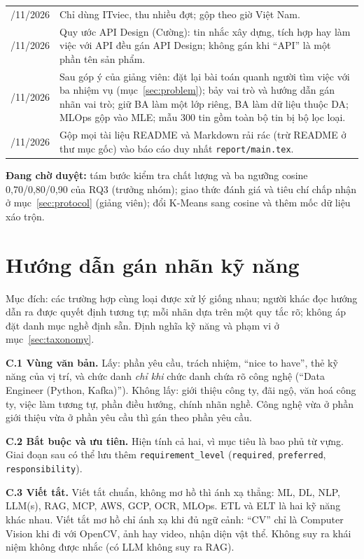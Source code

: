\documentclass[12pt]{article}
\newcommand{\code}[1]{\texttt{#1}}
\begin{document}
\begin{longtable}{>{\raggedright\arraybackslash}p{2.2cm} >{\raggedright\arraybackslash}p{12.4cm}}
03/11/2026 & Chỉ dùng ITviec, thu nhiều đợt; gộp theo giờ Việt Nam. \\
05/11/2026 & Quy ước API Design (Cường): tin nhắc xây dựng, tích hợp hay làm việc với API đều gán API Design; không gán khi ``API'' là một phần tên sản phẩm. \\
07/11/2026 & Sau góp ý của giảng viên: đặt lại bài toán quanh người tìm việc với ba nhiệm vụ (mục~\ref{sec:problem}); bảy vai trò và hướng dẫn gán nhãn vai trò; giữ BA làm một lớp riêng, BA làm dữ liệu thuộc DA; MLOps gộp vào MLE; mẫu 300 tin gồm toàn bộ tin bị bộ lọc loại. \\
08/11/2026 & Gộp mọi tài liệu README và Markdown rải rác (trừ README ở thư mục gốc) vào báo cáo duy nhất \code{report/main.tex}. \\
\bottomrule
\end{longtable}

\textbf{Đang chờ duyệt:} tám bước kiểm tra chất lượng và ba ngưỡng cosine 0,70/0,80/0,90 của RQ3 (trưởng nhóm); giao thức đánh giá và tiêu chí chấp nhận ở mục~\ref{sec:protocol} (giảng viên); đổi K-Means sang cosine và thêm mốc dữ liệu xáo trộn.

\section{Hướng dẫn gán nhãn kỹ năng}
\label{app:skill-guideline}
Mục đích: các trường hợp cùng loại được xử lý giống nhau; người khác đọc hướng dẫn ra được quyết định tương tự; mỗi nhãn dựa trên một quy tắc rõ; không áp đặt danh mục nghề định sẵn. Định nghĩa kỹ năng và phạm vi ở mục~\ref{sec:taxonomy}.

\textbf{C.1 Vùng văn bản.} Lấy: phần yêu cầu, trách nhiệm, ``nice to have'', thẻ kỹ năng của vị trí, và chức danh \textit{chỉ khi} chức danh chứa rõ công nghệ (``Data Engineer (Python, Kafka)''). Không lấy: giới thiệu công ty, đãi ngộ, văn hoá công ty, việc làm tương tự, phần điều hướng, chính nhãn nghề. Công nghệ vừa ở phần giới thiệu vừa ở phần yêu cầu thì gán theo phần yêu cầu.

\textbf{C.2 Bắt buộc và ưu tiên.} Hiện tính cả hai, vì mục tiêu là bao phủ từ vựng. Giai đoạn sau có thể lưu thêm \code{requirement\_level} (\code{required}, \code{preferred}, \code{responsibility}).

\textbf{C.3 Viết tắt.} Viết tắt chuẩn, không mơ hồ thì ánh xạ thẳng: ML, DL, NLP, LLM(s), RAG, MCP, AWS, GCP, OCR, MLOps. ETL và ELT là hai kỹ năng khác nhau. Viết tắt mơ hồ chỉ ánh xạ khi đủ ngữ cảnh: ``CV'' chỉ là Computer Vision khi đi với OpenCV, ảnh hay video, nhận diện vật thể. Không suy ra khái niệm không được nhắc (có LLM không suy ra RAG).
\end{document}
